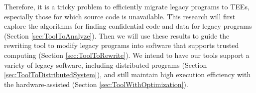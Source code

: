 Therefore, it is a tricky problem to efficiently migrate legacy programs to TEEs,
especially those for which source code is unavailable. This research
will first explore the algorithms for finding confidential code and data
for legacy programs (Section \ref{sec:ToolToAnalyze}). Then we will use these results
to guide the rewriting tool to modify legacy programs into software that
supports trusted computing (Section \ref{sec:ToolToRewrite}). We intend to have
our tools support a variety of legacy software, including distributed programs
(Section \ref{sec:ToolToDistributedSystem}), and still maintain high execution efficiency
with the hardware-assisted (Section \ref{sec:ToolWithOptimization}).
